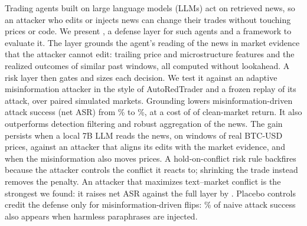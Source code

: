 Trading agents built on large language models (LLMs) act on retrieved news, so an attacker who edits or injects news can change their trades without touching prices or code. We present \rhal{}, a defense layer for such agents and a framework to evaluate it. The layer grounds the agent's reading of the news in market evidence that the attacker cannot edit: trailing price and microstructure features and the realized outcomes of similar past windows, all computed without lookahead. A risk layer then gates and sizes each decision. We test it against an adaptive misinformation attacker in the style of AutoRedTrader and a frozen replay of its attack, over  paired simulated markets. Grounding lowers misinformation-driven attack success (net ASR) from \% to \%, at a cost of \pp{} of clean-market return. It also outperforms detection filtering and robust aggregation of the news. The gain persists when a local 7B LLM reads the news, on  windows of real BTC-USD prices, against an attacker that aligns its edits with the market evidence, and when the misinformation also moves prices. A hold-on-conflict risk rule backfires because the attacker controls the conflict it reacts to; shrinking the trade instead removes the penalty. An attacker that maximizes text--market conflict is the strongest we found: it raises net ASR against the full layer by \pp{}. Placebo controls credit the defense only for misinformation-driven flips: \% of naive attack success also appears when harmless paraphrases are injected.
